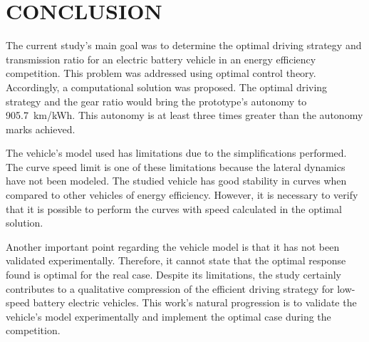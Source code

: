 \section{CONCLUSION}

The current study's main goal was to determine the optimal driving strategy and transmission ratio for an electric battery vehicle in an energy efficiency competition.  
This problem was addressed using optimal control theory. 
Accordingly, a computational solution was proposed. 
The optimal driving strategy and the gear ratio would bring the prototype's autonomy to \SI{905.7}{km/kWh}. 
This autonomy is at least three times greater than the autonomy marks achieved. 

The vehicle's model used has limitations due to the simplifications performed. The curve speed limit is one of these limitations because the lateral dynamics have not been modeled. 
The studied vehicle has good stability in curves when compared to other vehicles of energy efficiency. 
However, it is necessary to verify that it is possible to perform the curves with speed calculated in the optimal solution.

Another important point regarding the vehicle model is that it has not been validated experimentally. 
Therefore, it cannot state that the optimal response found is optimal for the real case.  
Despite its limitations, the study certainly contributes to a qualitative compression of the efficient driving strategy for low-speed battery electric vehicles. 
This work's natural progression is to validate the vehicle's model experimentally and implement the optimal case during the competition.